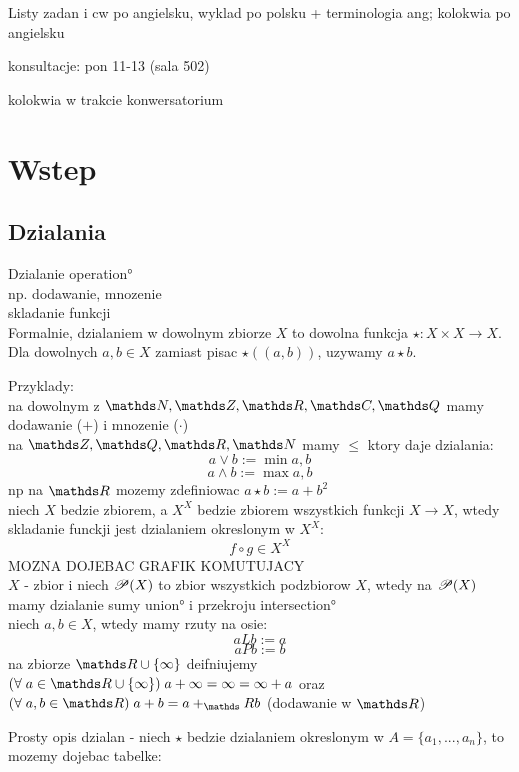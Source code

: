 Listy zadan i cw po angielsku, wyklad po polsku + terminologia ang; kolokwia po angielsku

konsultacje: pon 11-13 (sala 502)

kolokwia w trakcie konwersatorium

\section{Wstep}
\subsection{Dzialania}

\begin{multicols}{2}
    
    {\color{def}Dzialanie} \ang{operation}\\
        \point np. dodawanie, mnozenie\\
        \point skladanie funkcji\\
    Formalnie, dzialaniem w dowolnym zbiorze $X$ to dowolna funkcja $\star:X\times X\to X$. Dla dowolnych $a,b\in X$ zamiast pisac $\star((a,b))$, uzywamy $a\star b$.
    \medskip

    {\color{acc}Przyklady:}\\
    \point na dowolnym z $\N,\Z, \R, \C, \Q$ mamy dodawanie ($+$) i mnozenie ($\cdot$)\\
    \point na $\Z, \Q,\R, \N$ mamy $\leq$ ktory daje dzialania: 
    $$a\lor b:=\min{a, b}$$
    $$a\land b:=\max{a,b}$$
    \point np na $\R$ mozemy zdefiniowac $a\star b:= a+b^2$\\
    \point niech $X$ bedzie zbiorem, a $X^X$ bedzie zbiorem wszystkich funkcji $X\to X$, wtedy skladanie funckji jest dzialaniem okreslonym w $X^X$:
    $$f\circ g\in X^X$$ 
    {\color{cyan}MOZNA DOJEBAC GRAFIK KOMUTUJACY}\\
    \point $X$ - zbior i niech $\mathcal{P}(X)$ to zbior wszystkich podzbiorow $X$, wtedy na $\mathcal{P}(X)$ mamy dzialanie sumy \ang{union} i przekroju \ang{intersection}\\
    \point niech $a, b\in X$, wtedy mamy rzuty na osie:
    $$aLb:=a$$
    $$aPb:=b$$
    \point na zbiorze $\R\cup\{\infty\}$ deifniujemy $(\forall\;a\in \R\cup\{\infty\})\;a+\infty=\infty=\infty+a$ oraz $(\forall\;a, b\in \R)\;a+b=a+_\R b$ (dodawanie w $\R$)
    \medskip

    Prosty opis dzialan - niech $\star$ bedzie dzialaniem okreslonym w $A=\{a_1,..., a_n\}$, to mozemy dojebac tabelke:


\end{multicols}

